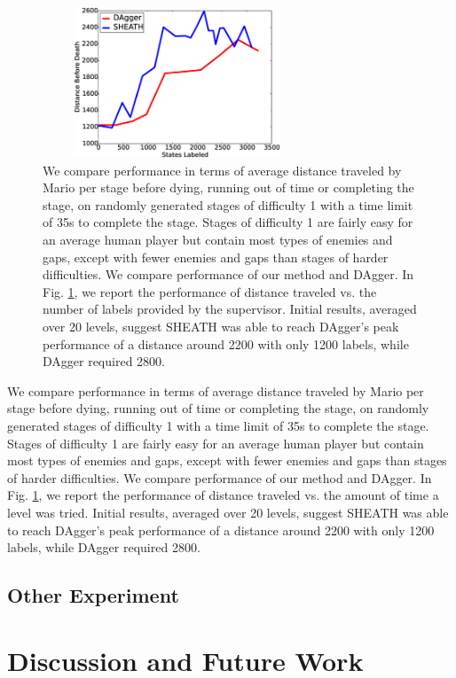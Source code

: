 \documentclass[10pt, conference]{ieeeconf}      %
\begin{document}
\begin{figure}[ht]
\centering

\includegraphics[width=8cm, height = 4.5cm]{figures/dagger_sheath_mario.eps}


\caption{We compare performance in terms of average distance traveled by Mario per stage before dying, running out of time or completing the stage, on randomly generated stages of difficulty 1 with a time limit of 35s to complete the stage.  Stages of difficulty 1 are fairly easy for an average human player but contain most types of enemies and gaps, except with fewer enemies and gaps than stages of harder difficulties. We compare performance of our method and DAgger. In Fig. \ref{fig:mario_results}, we report the performance of distance traveled vs. the number of labels provided by the supervisor. Initial results, averaged over 20 levels, suggest SHEATH was able to reach DAgger's peak performance of a distance around 2200 with only 1200 labels, while DAgger required 2800.   }
\label{fig:mario_results}
\end{figure}

We compare performance in terms of average distance traveled by Mario per stage before dying, running out of time or completing the stage, on randomly generated stages of difficulty 1 with a time limit of 35s to complete the stage.  Stages of difficulty 1 are fairly easy for an average human player but contain most types of enemies and gaps, except with fewer enemies and gaps than stages of harder difficulties. We compare performance of our method and DAgger. In Fig. \ref{fig:mario_results}, we report the performance of distance traveled vs. the amount of time a level was tried.  Initial results, averaged over 20 levels,  suggest SHEATH was able to reach DAgger's peak performance of a distance around 2200 with only 1200 labels, while DAgger required 2800.  



\subsection{Other Experiment}


\section{Discussion and Future Work}




\end{document}
